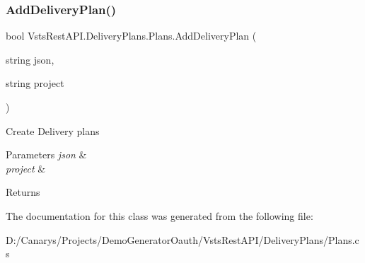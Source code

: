 \subsubsection{\texorpdfstring{Add\+Delivery\+Plan()}{AddDeliveryPlan()}}
{\footnotesize\ttfamily bool Vsts\+Rest\+A\+P\+I.\+Delivery\+Plans.\+Plans.\+Add\+Delivery\+Plan (\begin{DoxyParamCaption}\item[{string}]{json,  }\item[{string}]{project }\end{DoxyParamCaption})}



Create Delivery plans 


\begin{DoxyParams}{Parameters}
{\em json} & \\
\hline
{\em project} & \\
\hline
\end{DoxyParams}
\begin{DoxyReturn}{Returns}

\end{DoxyReturn}


The documentation for this class was generated from the following file\+:\begin{DoxyCompactItemize}
\item 
D\+:/\+Canarys/\+Projects/\+Demo\+Generator\+Oauth/\+Vsts\+Rest\+A\+P\+I/\+Delivery\+Plans/Plans.\+cs\end{DoxyCompactItemize}
